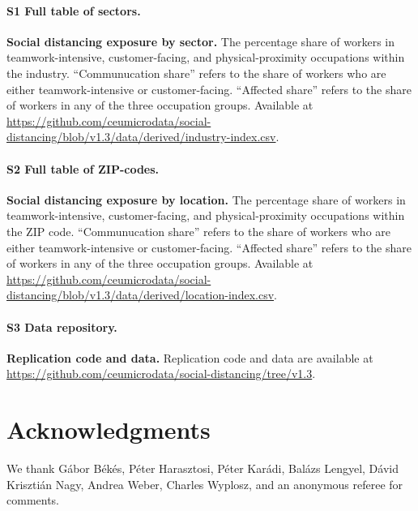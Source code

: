 \paragraph*{S1 Full table of sectors.}
\label{S1_File}
{\bf Social distancing exposure by sector.} The percentage share of workers in teamwork-intensive, customer-facing, and physical-proximity occupations within the industry. ``Communucation share'' refers to the share of workers who are either teamwork-intensive or customer-facing. ``Affected share'' refers to the share of workers in any of the three occupation groups. Available at \url{https://github.com/ceumicrodata/social-distancing/blob/v1.3/data/derived/industry-index.csv}.

\paragraph*{S2 Full table of ZIP-codes.}
\label{S2_File}
{\bf Social distancing exposure by location.} The percentage share of workers in teamwork-intensive, customer-facing, and physical-proximity occupations within the ZIP code. ``Communucation share'' refers to the share of workers who are either teamwork-intensive or customer-facing. ``Affected share'' refers to the share of workers in any of the three occupation groups. Available at \url{https://github.com/ceumicrodata/social-distancing/blob/v1.3/data/derived/location-index.csv}.

\paragraph*{S3 Data repository.}
\label{S3_URL}
{\bf Replication code and data.} Replication code and data are available at \url{https://github.com/ceumicrodata/social-distancing/tree/v1.3}.

\section*{Acknowledgments}
We thank Gábor Békés, Péter Harasztosi, Péter Karádi, Balázs Lengyel, Dávid Krisztián Nagy, Andrea Weber, Charles Wyplosz, and an anonymous referee for comments.

\nolinenumbers



